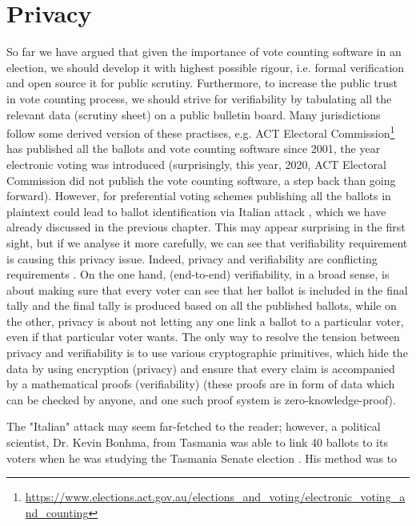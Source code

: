 \section{Privacy}
   So far we have argued that given the  importance of vote counting software in an election, we should 
   develop it with highest possible rigour, i.e. formal verification and open source it for public scrutiny. Furthermore, 
   to increase the public trust in vote counting process, we should strive for verifiability by tabulating all the 
   relevant data (scrutiny sheet) on a public bulletin board.  Many jurisdictions follow some derived version of these practises, e.g.  ACT Electoral 
   Commission\footnote{\url{https://www.elections.act.gov.au/elections_and_voting/electronic_voting_and_counting}}
   has published all the ballots and vote counting software since 2001, the year electronic voting  was introduced 
   (surprisingly,  this year,  2020,  ACT Electoral Commission did not  publish the vote counting software, a step back than 
   going forward).  However, for preferential voting schemes publishing all the ballots in plaintext could lead to ballot identification
   via Italian attack \citep{Otten}, which we have already discussed in the previous chapter.    This may appear surprising in the 
   first sight,  but if we analyse it more carefully,  we can see that verifiability requirement is causing this privacy issue.   Indeed, 
   privacy and verifiability are conflicting requirements \citep{JONKER20131}.  
   On the one hand,  (end-to-end) verifiability, in a broad sense,  is about making sure that
   every voter can see that her ballot is included in the final tally and the final tally is produced based on all the published ballots, 
   while on the other, privacy is about not letting any one link a ballot to a particular voter,  even if that particular voter wants.  
   The only way to resolve the tension between privacy 
   and verifiability is to use various cryptographic primitives,  which hide the data  by using encryption (privacy) and 
   ensure that every claim is accompanied by a mathematical proofs (verifiability) (these proofs are in form of data which 
   can be checked by anyone,  and one such proof system is zero-knowledge-proof).  
   
   
   The "Italian" attack may seem far-fetched to the reader; however,  a political scientist,  Dr. Kevin Bonhma,
   from Tasmania was able to link   40 ballots to its voters when he was studying the Tasmania Senate election \citep{TasmaniaVoting}.  
   His method was to
   
